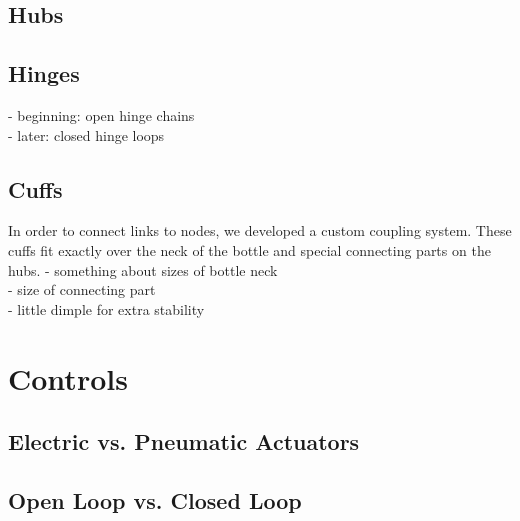 \subsection{Hubs}
\subsection{Hinges}

- beginning: open hinge chains\\
- later: closed hinge loops
\subsection{Cuffs}
In order to connect links to nodes, we developed a custom coupling system. These cuffs fit exactly over the neck of the bottle and special connecting parts on the hubs.
- something about sizes of bottle neck\\
- size of connecting part\\
- little dimple for extra stability\\
\section{Controls}
\subsection{Electric vs. Pneumatic Actuators}
\subsection{Open Loop vs. Closed Loop}

